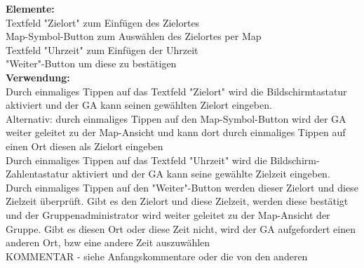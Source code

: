 \textbf{Elemente:}\\
Textfeld "Zielort" zum Einfügen des Zielortes\\
Map-Symbol-Button zum Auswählen des Zielortes per Map\\
Textfeld "Uhrzeit" zum Einfügen der Uhrzeit\\
"Weiter"-Button um diese zu bestätigen\\
\textbf{Verwendung:}\\
Durch einmaliges Tippen auf das Textfeld "Zielort" wird die Bildschirmtastatur aktiviert und der GA kann seinen gewählten Zielort eingeben.\\
Alternativ: durch einmaliges Tippen auf den Map-Symbol-Button wird der GA weiter geleitet zu der Map-Ansicht und kann dort durch einmaliges Tippen auf einen Ort diesen als Zielort eingeben\\
Durch einmaliges Tippen auf das Textfeld "Uhrzeit" wird die Bildschirm-Zahlentastatur aktiviert und der GA kann seine gewählte Zielzeit eingeben.\\
Durch einmaliges Tippen auf den "Weiter"-Button werden dieser Zielort und diese Zielzeit überprüft. Gibt es den Zielort und diese Zielzeit, werden diese bestätigt und der Gruppenadministrator wird weiter geleitet zu der Map-Ansicht der Gruppe. Gibt es diesen Ort oder diese Zeit nicht, wird der GA aufgefordert einen anderen Ort, bzw eine andere Zeit auszuwählen\\

KOMMENTAR
- siehe Anfangskommentare oder die von den anderen 


